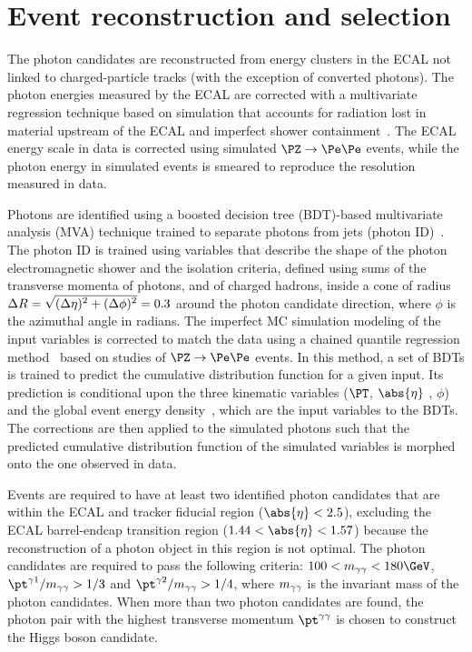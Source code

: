 \documentclass[11pt,twoside,a4paper,cmspaper,final,collab]{cms-tdr}
\begin{document}
\section{Event reconstruction and selection}\label{sec:objects}

The photon candidates are reconstructed from energy clusters in the ECAL not linked to charged-particle tracks (with the exception of converted photons). The photon energies measured by the ECAL are corrected with a multivariate regression technique based on simulation that accounts for radiation lost in material upstream of the ECAL and imperfect shower containment~\cite{Sirunyan:2018ouh}. The ECAL energy scale in data is corrected using simulated $\Zee$ events, while the photon energy in simulated events is smeared to reproduce the resolution measured in data. 

Photons are identified using a boosted decision tree (BDT)-based multivariate analysis (MVA) technique trained to separate photons from jets (photon ID)~\cite{Sirunyan:2018ouh}. The photon ID is trained using variables that describe the shape of the photon electromagnetic shower and the isolation criteria, defined using sums of the transverse momenta of photons, and of charged 
hadrons, inside a cone of radius $\Delta R = \sqrt{\smash[b]{(\Delta \eta)^2 +(\Delta \phi)^2}} = 0.3$ around the photon candidate direction, where $\phi$ is the azimuthal angle in radians. The imperfect MC simulation modeling of the input variables is corrected to match the data using a chained quantile regression method~\cite{cqr} based on studies of $\Zee$ events. In this method, a set of BDTs is trained to predict the cumulative distribution function for a given input. Its prediction is conditional upon the three kinematic variables ($\PT$, $\abs{\eta}$ , $\phi$) and the global event energy density~\cite{Sirunyan:2018ouh}, which are the input variables to the BDTs. The corrections are then applied to the simulated photons such that the predicted cumulative distribution function of the simulated variables is morphed onto the one observed in data.

Events are required to have at least two identified photon candidates that are within the ECAL and tracker fiducial region ($\abs{\eta} < 2.5$), excluding the ECAL barrel-endcap transition region ($1.44 < \abs{\eta} < 1.57$) because the reconstruction of a photon object in this region is not optimal. The photon candidates are required to pass the following criteria: $100 < \Mgg < 180 \GeV$, \mbox{$\ptgone/\Mgg > 1/3$} and \mbox{$\ptgtwo/\Mgg > 1/4$}, where $m_{\gamma\gamma}$ is the invariant mass of the photon candidates. When more than two photon candidates are found, the photon pair with the highest transverse momentum $\ptgg$ is chosen to construct the Higgs boson candidate.
\end{document}
